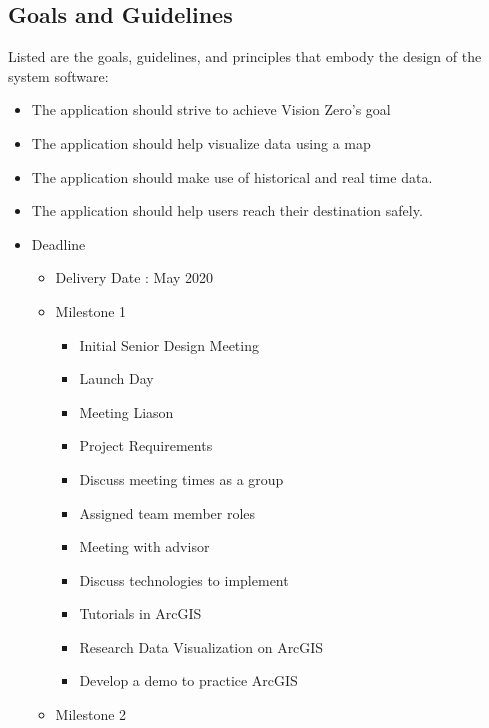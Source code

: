 \documentclass[a4paper,12pt]{article}
\begin{document}
    \subsection{Goals and Guidelines}
        Listed are the goals, guidelines, and principles that embody the design of the system software:
            \begin{itemize}
                \item The application should strive to achieve Vision Zero’s goal
                \item The application should help visualize data using a map
                \item The application should make use of historical and real time data.
                \item The application should help users reach their destination safely.
                \item Deadline
                    \begin{itemize}
                        \item Delivery Date : May 2020
                        \item Milestone 1
                        \begin{itemize}
                            \item Initial Senior Design Meeting
                            \item Launch Day 
                            \item Meeting Liason
                            \item Project Requirements
                            \item Discuss meeting times as a group
                            \item Assigned team member roles
                            \item Meeting with advisor
                            \item Discuss technologies to implement
                            \item Tutorials in ArcGIS
                            \item Research Data Visualization on ArcGIS
                            \item Develop a demo to practice ArcGIS
                        \end{itemize}
                        \item Milestone 2
                            \begin{itemize}

\end{itemize}
\end{itemize}
\end{itemize}
\end{document}
